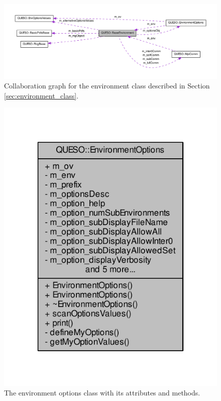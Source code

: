 \begin{figure}[!hp]
\centering
\includegraphics[scale=0.60,clip=true]{rawfigs/base_env_coll.pdf}
\vspace*{-1.cm}
\caption{Collaboration graph for the environment class described in Section \ref{sec:environment_class}.}
\label{fig-env-coll}
\end{figure}

\begin{figure}[htpb]
\centering
\includegraphics[scale=0.8,clip=true]{rawfigs/environment_options}
\vspace*{-1.2cm}
\caption{The environment options class with its attributes and methods.}
\label{fig-env-options-class}
\end{figure}

